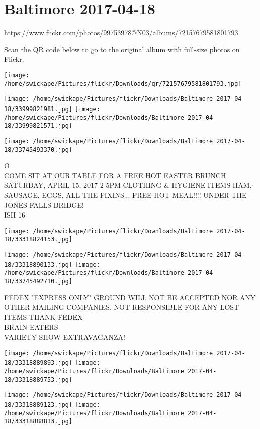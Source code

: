 \documentclass[10pt,letterpaper]{article}
\title{}
\author{}
\date{}
\begin{document}
\section*{Baltimore 2017-04-18}

\url{https://www.flickr.com/photos/99753978@N03/albums/72157679581801793}

Scan the QR code below to go to the original album with full-size photos on Flickr:

\texttt{[image: /home/swickape/Pictures/flickr/Downloads/qr/72157679581801793.jpg]}
\pagebreak

\texttt{[image: /home/swickape/Pictures/flickr/Downloads/Baltimore 2017-04-18/33999821981.jpg]}
\texttt{[image: /home/swickape/Pictures/flickr/Downloads/Baltimore 2017-04-18/33999821571.jpg]}

\texttt{[image: /home/swickape/Pictures/flickr/Downloads/Baltimore 2017-04-18/33745493370.jpg]}

O\\
COME SIT AT OUR TABLE FOR A FREE HOT EASTER BRUNCH SATURDAY, APRIL 15, 2017 2{-}5PM CLOTHING \& HYGIENE ITEMS HAM, SAUSAGE, EGGS, ALL THE FIXINS... FREE HOT MEAL!!!! UNDER THE JONES FALLS BRIDGE!\\
ISH 16
\pagebreak

\texttt{[image: /home/swickape/Pictures/flickr/Downloads/Baltimore 2017-04-18/33318824153.jpg]}

\vspace{0.25in}
\texttt{[image: /home/swickape/Pictures/flickr/Downloads/Baltimore 2017-04-18/33318890133.jpg]}
\texttt{[image: /home/swickape/Pictures/flickr/Downloads/Baltimore 2017-04-18/33745492710.jpg]}

FEDEX "EXPRESS ONLY" GROUND WILL NOT BE ACCEPTED NOR ANY OTHER MAILING COMPANIES.  NOT RESPONSIBLE FOR ANY LOST ITEMS THANK FEDEX\\
BRAIN EATERS\\
VARIETY SHOW EXTRAVAGANZA!
\pagebreak

\texttt{[image: /home/swickape/Pictures/flickr/Downloads/Baltimore 2017-04-18/33318889893.jpg]}
\texttt{[image: /home/swickape/Pictures/flickr/Downloads/Baltimore 2017-04-18/33318889753.jpg]}

\texttt{[image: /home/swickape/Pictures/flickr/Downloads/Baltimore 2017-04-18/33318889123.jpg]}
\texttt{[image: /home/swickape/Pictures/flickr/Downloads/Baltimore 2017-04-18/33318888813.jpg]}
\end{document}
